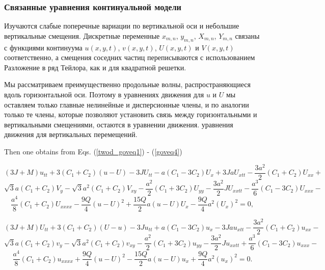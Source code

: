 \subsubsection{Связанные уравнения континуальной модели}

Изучаются слабые поперечные вариации по вертикальной оси и небольшие вертикальные смещения. Дискретные переменные $ x_{m, n} $, $ y_{m, n} $, $ X_{m, n} $, $ Y_{m, n} $ связаны с функциями континуума $u (x, y, t)$, $v (x, y, t)$, $U (x, y, t)$ и $ V(x, y, t)$ соответственно, а смещения соседних частиц переписываются с использованием Разложение в ряд Тейлора, как и для квадратной решетки.

Мы рассматриваем преимущественно продольные волны, распространяющиеся вдоль горизонтальной оси. Поэтому в уравнениях движения для $u$ и $U$ мы оставляем только главные нелинейные и дисперсионные члены, и по аналогии только те члены, которые позволяют установить связь между горизонтальными и вертикальными смещениями, остаются в уравнении движения. уравнения движения для вертикальных перемещений.

Then one obtains from Eqs. (\ref{twod_goveq1}) - (\ref{goveq4}) \cite{poros19}

\[
(3J+M)u_{tt} +3(C_1+C_2)(u-U) - 3JU_{tt} -a(C_1-3C_2)U_x +3JaU_{xtt} - \frac{3a^2}{2}(C_1+C_2)U_{xx} +
\]
\[
\sqrt{3}a(C_1+C_2)V_y - \sqrt{3}a^2(C_1+C_2)V_{xy} - \frac{a^2}{2}(C_1+3C_2)U_{yy} - \frac{3a^2}{2}JU_{xxtt} - \frac{a^3}{6}(C_1-3C_2)U_{xxx} -
\]
\begin{equation}
	\frac{a^4}{8}(C_1+C_2)U_{xxxx} -  \frac{9Q}{4}(u-U)^2 + \frac{15Q}{2}a(u-U)U_{x} - \frac{9Q}{4}a^2(U_x)^2 = 0,
\end{equation}


\[
(3J+M)U_{tt} +3(C_1+C_2)(U-u) - 3Ju_{tt} + a(C_1-3C_2)u_x -3Jau_{xtt} - \frac{3a^2}{2}(C_1+C_2)u_{xx} -
\]
\[
\sqrt{3}a(C_1+C_2)v_y - \sqrt{3}a^2(C_1+C_2)v_{xy} - \frac{a^2}{2}(C_1+3C_2)u_{yy} - \frac{3a^2}{2}Ju_{xxtt} +
\frac{a^3}{6}(C_1-3C_2)u_{xxx} -
\]
\begin{equation}
	\frac{a^4}{8}(C_1+C_2)u_{xxxx} +  \frac{9Q}{4}(u-U)^2 - \frac{15Q}{2}a(u-U)u_{x} + \frac{9Q}{4}a^2(u_x)^2 = 0. 
\end{equation}

